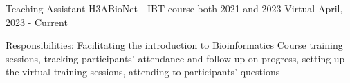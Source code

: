 



\begin{cventries}
   \cventry
    {Teaching Assistant} %
    {H3ABioNet - IBT course both 2021 and 2023} %
    {Virtual} %
    {April, 2023 - Current} %
    {
      \begin{cvitems} %
        \item {Responsibilities:  Facilitating the introduction to Bioinformatics  Course training sessions, tracking participants' attendance and follow up on progress,  setting up the virtual training sessions, attending to participants' questions}
      \end{cvitems}
    }
\end{cventries}

 
 